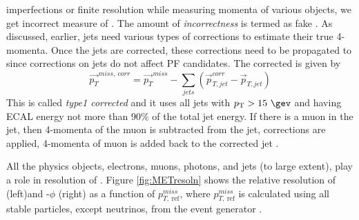 imperfections or finite resolution while measuring momenta of various objects, we get incorrect measure of \ptmiss. The amount of 
\textit{incorrectness} is termed as fake \ptmiss. As discussed, earlier, jets need various types of corrections to estimate their true 
4-momenta. Once the jets are corrected, these corrections need to be propagated to \ptmiss since corrections on jets do not affect PF 
candidates. The corrected \ptmiss is given by
\begin{equation}
\vec{p_{T}}^{miss,\ corr} = \vec{p_{T}}^{miss} - \sum_{jets}^{}(\vec{p}_{T,jet}^{corr} - \vec{p}_{T,jet}) 
\end{equation}
This \ptmiss is called \textit{type1 corrected \ptmiss} and it uses all jets with $\pt > 15\ \gev$ and having ECAL energy not more than 
90\% of the total jet energy. If there is a muon in the jet, then 4-momenta of the muon is subtracted from the jet, corrections are 
applied, 4-momenta of muon is added back to the corrected jet \cite{CMS-PAS-JME-16-004}.

All the physics objects, electrons, muons, photons, and jets (to large extent), play a role in resolution of \ptmiss. Figure 
\ref{fig:METresoln} shows the relative resolution of \ptmiss (left)and \ptmiss-$\phi$ (right) as a function of $p_{T,\ 
\mathrm{ref}}^{miss}$, where $p_{T,\ \mathrm{ref}}^{miss}$ is calculated using all stable particles, except neutrinos, from the event 
generator \cite{CMS-PRF-14-001}.